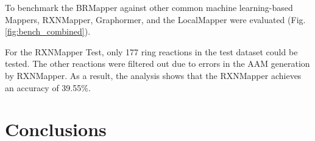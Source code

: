 \documentclass[a4paper,12pt]{article} %
\begin{document}

To benchmark the BRMapper against other common machine learning-based Mappers, RXNMapper, Graphormer, and the LocalMapper were evaluated (Fig.\ref{fig:bench_combined}). 

For the RXNMapper Test, only 177 ring reactions in the test dataset could be tested. The other reactions were filtered out due to errors in the AAM generation by RXNMapper. As a result, the analysis shows that the RXNMapper achieves an accuracy of 39.55\%.







\section{Conclusions}


\printbibliography	
\end{document}
